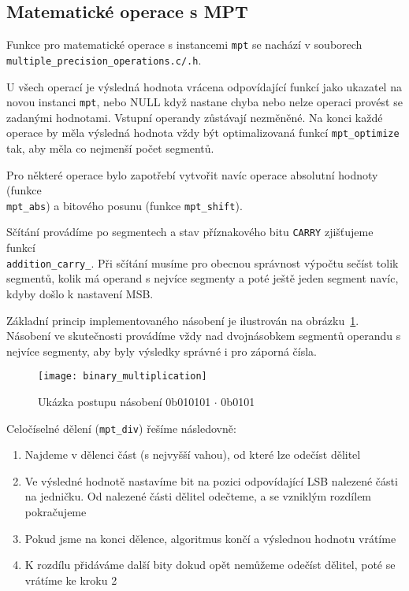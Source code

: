 \subsection{Matematické operace s MPT}\label{subsection:mpt_operace}
Funkce pro matematické operace s instancemi \verb|mpt| se nachází v souborech \\\verb|multiple_precision_operations.c/.h|.

U všech operací je výsledná hodnota vrácena odpovídající funkcí jako ukazatel na novou instanci \verb|mpt|, nebo NULL když nastane chyba nebo nelze operaci provést se zadanými hodnotami. Vstupní operandy zůstávají nezměněné. Na konci každé operace by měla výsledná hodnota vždy být optimalizovaná funkcí \verb|mpt_optimize| tak, aby měla co nejmenší počet segmentů. 

Pro některé operace bylo zapotřebí vytvořit navíc operace absolutní hodnoty (funkce \\ \verb|mpt_abs|) a bitového posunu (funkce \verb|mpt_shift|).

Sčítání provádíme po segmentech a stav příznakového bitu \verb|CARRY| zjišťujeme funkcí \\\verb|addition_carry_|. Při sčítání musíme pro obecnou správnost výpočtu sečíst tolik segmentů, kolik má operand s nejvíce segmenty a poté ještě jeden segment navíc, kdyby došlo k nastavení MSB.

Základní princip implementovaného násobení je ilustrován na obrázku~\ref{fig:binary_multiplication}.
Násobení ve skutečnosti provádíme vždy nad dvojnásobkem segmentů operandu s nejvíce segmenty, aby byly výsledky správné i pro záporná čísla.

\begin{figure}[ht]
    \centering
    \texttt{[image: binary\_multiplication]}
    \caption{Ukázka postupu násobení 0b010101 $\cdot{}$ 0b0101}\label{fig:binary_multiplication}
\end{figure}

Celočíselné dělení (\verb|mpt_div|) řešíme následovně:
\begin{enumerate}
    \item Najdeme v dělenci část (s nejvyšší vahou), od které lze odečíst dělitel
    \item Ve výsledné hodnotě nastavíme bit na pozici odpovídající LSB nalezené části na jedničku. Od nalezené části dělitel odečteme, a se vzniklým rozdílem pokračujeme
    \item Pokud jsme na konci dělence, algoritmus končí a výslednou hodnotu vrátíme
    \item K rozdílu přidáváme další bity dokud opět nemůžeme odečíst dělitel, poté se vrátíme ke kroku 2 
\end{enumerate}

